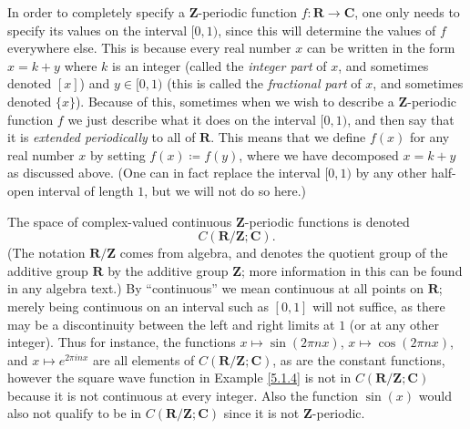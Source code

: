 \begin{note}
    In order to completely specify a \(\mathbf{Z}\)-periodic function \(f : \mathbf{R} \to \mathbf{C}\), one only needs to specify its values on the interval \([0, 1)\), since this will determine the values of \(f\) everywhere else.
    This is because every real number \(x\) can be written in the form \(x = k + y\) where \(k\) is an integer (called the \emph{integer part} of \(x\), and sometimes denoted \([x]\)) and \(y \in [0, 1)\) (this is called the \emph{fractional part} of \(x\), and sometimes denoted \(\{x\}\)).
    Because of this, sometimes when we wish to describe a \(\mathbf{Z}\)-periodic function \(f\) we just describe what it does on the interval \([0, 1)\), and then say that it is \emph{extended periodically} to all of \(\mathbf{R}\).
    This means that we define \(f(x)\) for any real number \(x\) by setting \(f(x) \coloneqq f(y)\), where we have decomposed \(x = k + y\) as discussed above.
    (One can in fact replace the interval \([0, 1)\) by any other half-open interval of length \(1\), but we will not do so here.)
\end{note}

\begin{note}
    The space of complex-valued continuous \(\mathbf{Z}\)-periodic functions is denoted
    \[
        C(\mathbf{R} / \mathbf{Z} ; \mathbf{C}).
    \]
    (The notation \(\mathbf{R} / \mathbf{Z}\) comes from algebra, and denotes the quotient group of the additive group \(\mathbf{R}\) by the additive group \(\mathbf{Z}\);
    more information in this can be found in any algebra text.)
    By ``continuous'' we mean continuous at all points on \(\mathbf{R}\);
    merely being continuous on an interval such as \([0, 1]\) will not suffice, as there may be a discontinuity between the left and right limits at \(1\) (or at any other integer).
    Thus for instance, the functions \(x \mapsto \sin(2 \pi n x)\), \(x \mapsto \cos(2 \pi n x)\), and \(x \mapsto e^{2 \pi i n x}\) are all elements of \(C(\mathbf{R} / \mathbf{Z} ; \mathbf{C})\), as are the constant functions, however the square wave function in Example \ref{5.1.4} is not in \(C(\mathbf{R} / \mathbf{Z} ; \mathbf{C})\) because it is not continuous at every integer.
    Also the function \(\sin(x)\) would also not qualify to be in \(C(\mathbf{R} / \mathbf{Z} ; \mathbf{C})\) since it is not \(\mathbf{Z}\)-periodic.
\end{note}

